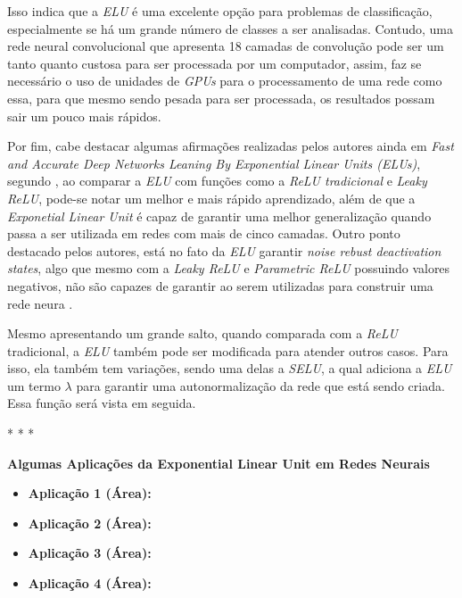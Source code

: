 Isso indica que a \textit{ELU} é uma excelente opção para problemas de classificação, especialmente se há um grande número de classes a ser analisadas. Contudo, uma rede neural convolucional que apresenta 18 camadas de convolução pode ser um tanto quanto custosa para ser processada por um computador, assim, faz se necessário o uso de unidades de \textit{GPUs} para o processamento de uma rede como essa, para que mesmo sendo pesada para ser processada, os resultados possam sair um pouco mais rápidos.

Por fim, cabe destacar algumas afirmações realizadas pelos autores ainda em \textit{Fast and Accurate Deep Networks Leaning By Exponential Linear Units (ELUs)}, segundo \textcite{ELUArticle}, ao comparar a \textit{ELU} com funções como a \textit{ReLU tradicional} e \textit{Leaky ReLU}, pode-se notar um melhor e mais rápido aprendizado, além de que a \textit{Exponetial Linear Unit} é capaz de garantir uma melhor generalização quando passa a ser utilizada em redes com mais de cinco camadas. Outro ponto destacado pelos autores, está no fato da \textit{ELU} garantir \textit{noise rebust deactivation states}, algo que mesmo com a \textit{Leaky ReLU} e \textit{Parametric ReLU} possuindo valores negativos, não são capazes de garantir ao serem utilizadas para construir uma rede neura \parencite{ELUArticle}.

Mesmo apresentando um grande salto, quando comparada com a \textit{ReLU} tradicional, a \textit{ELU} também pode ser modificada para atender outros casos. Para isso, ela também tem variações, sendo uma delas a \textit{SELU}, a qual adiciona a \textit{ELU} um termo $\lambda$ para garantir uma autonormalização da rede que está sendo criada. Essa função será vista em seguida.

\medskip
\begin{center}
 * * *
\end{center}
\medskip

\textbf{Algumas Aplicações da Exponential Linear Unit em Redes Neurais} 
\vspace{1em}

\begin{itemize}
    \item \textbf{Aplicação 1 (Área):}
    \item \textbf{Aplicação 2 (Área):}
    \item \textbf{Aplicação 3 (Área):}
    \item \textbf{Aplicação 4 (Área):}
\end{itemize}

